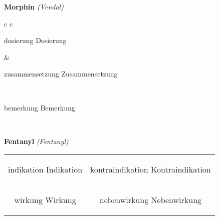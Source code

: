 \documentclass[12pt]{beamer}
\begin{document}
\begin{frame}{
    \textbf{Morphin}
    \textit{(Vendal)}
}
    \begin{tabular}{c c}
        \begin{beamercolorbox}[wd=\boxwidth\textwidth,ht=\boxheight\textheight,sep=1em]{dosierung}
        Dosierung
        \end{beamercolorbox} & 
        \begin{beamercolorbox}[wd=\boxwidth\textwidth,ht=\boxheight\textheight,sep=1em]{zusammensetzung}
        Zusammensetzung
        \end{beamercolorbox} \\
        \begin{beamercolorbox}[wd=\textwidth,ht=\boxheight\textheight,sep=1em]{bemerkung}
        Bemerkung
        \end{beamercolorbox} \\
    \end{tabular}
\end{frame}

\begin{frame}{
    \textbf{Fentanyl}
    \textit{(Fentanyl)}
}
    \begin{tabular}{c c}
        \begin{beamercolorbox}[wd=\boxwidth\textwidth,ht=\boxheight\textheight,sep=1em]{indikation}
        Indikation
        \end{beamercolorbox} & 
        \begin{beamercolorbox}[wd=\boxwidth\textwidth,ht=\boxheight\textheight,sep=1em]{kontraindikation}
        Kontraindikation 
        \end{beamercolorbox} \\
        \begin{beamercolorbox}[wd=\boxwidth\textwidth,ht=\boxheight\textheight,sep=1em]{wirkung}
        Wirkung
        \end{beamercolorbox} & 
        \begin{beamercolorbox}[wd=\boxwidth\textwidth,ht=\boxheight\textheight,sep=1em]{nebenwirkung}
        Nebenwirkung
        \end{beamercolorbox} \\
    \end{tabular}
\end{frame}
\end{document}
